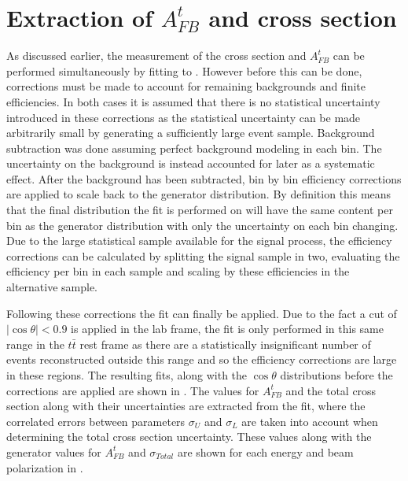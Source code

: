 \section{Extraction of $A_{FB}^t$ and cross section}
As discussed earlier, the measurement of the cross section and $A_{FB}^t$ can be performed simultaneously by fitting to . However before this can be done, corrections must be made to account for remaining backgrounds and finite efficiencies. In both cases it is assumed that there is no statistical uncertainty introduced in these corrections as the statistical uncertainty can be made arbitrarily small by generating a sufficiently large event sample. Background subtraction was done assuming perfect background modeling in each bin. The uncertainty on the background is instead accounted for later as a systematic effect. After the background has been subtracted, bin by bin efficiency corrections are applied to scale back to the generator distribution. By definition this means that the final distribution the fit is performed on will have the same content per bin as the generator distribution with only the uncertainty on each bin changing. Due to the large statistical sample available for the signal process, the efficiency corrections can be calculated by splitting the signal sample in two, evaluating the efficiency per bin in each sample and scaling by these efficiencies in the alternative sample.

Following these corrections the fit can finally be applied. Due to the fact a cut of $\mid\cos\theta\mid < 0.9$ is applied in the lab frame, the fit is only performed in this same range in the $t\bar{t}$ rest frame as there are a statistically insignificant number of events reconstructed outside this range and so the efficiency corrections are large in these regions. The resulting fits, along with the $\cos\theta$ distributions before the corrections are applied are shown in . The values for $A_{FB}^t$ and the total cross section along with their uncertainties are extracted from the fit, where the correlated errors between parameters $\sigma_U$ and $\sigma_L$ are taken into account when determining the total cross section uncertainty. These values along with the generator values for $A_{FB}^t$ and $\sigma_{Total}$ are shown for each energy and beam polarization in .


